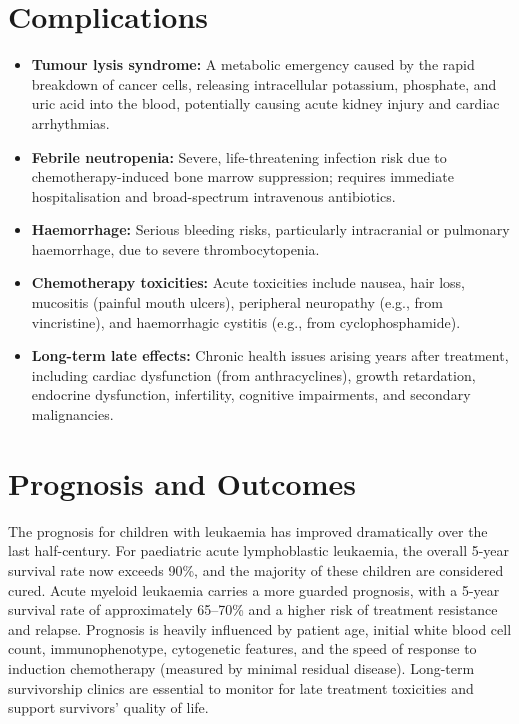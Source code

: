 \section*{Complications}
\begin{itemize}
    \item \textbf{Tumour lysis syndrome:} A metabolic emergency caused by the rapid breakdown of cancer cells, releasing intracellular potassium, phosphate, and uric acid into the blood, potentially causing acute kidney injury and cardiac arrhythmias.
    \item \textbf{Febrile neutropenia:} Severe, life-threatening infection risk due to chemotherapy-induced bone marrow suppression; requires immediate hospitalisation and broad-spectrum intravenous antibiotics.
    \item \textbf{Haemorrhage:} Serious bleeding risks, particularly intracranial or pulmonary haemorrhage, due to severe thrombocytopenia.
    \item \textbf{Chemotherapy toxicities:} Acute toxicities include nausea, hair loss, mucositis (painful mouth ulcers), peripheral neuropathy (e.g., from vincristine), and haemorrhagic cystitis (e.g., from cyclophosphamide).
    \item \textbf{Long-term late effects:} Chronic health issues arising years after treatment, including cardiac dysfunction (from anthracyclines), growth retardation, endocrine dysfunction, infertility, cognitive impairments, and secondary malignancies.
\end{itemize}

\section*{Prognosis and Outcomes}
The prognosis for children with leukaemia has improved dramatically over the last half-century. For paediatric acute lymphoblastic leukaemia, the overall 5-year survival rate now exceeds 90\%, and the majority of these children are considered cured. Acute myeloid leukaemia carries a more guarded prognosis, with a 5-year survival rate of approximately 65--70\% and a higher risk of treatment resistance and relapse. Prognosis is heavily influenced by patient age, initial white blood cell count, immunophenotype, cytogenetic features, and the speed of response to induction chemotherapy (measured by minimal residual disease). Long-term survivorship clinics are essential to monitor for late treatment toxicities and support survivors' quality of life.

